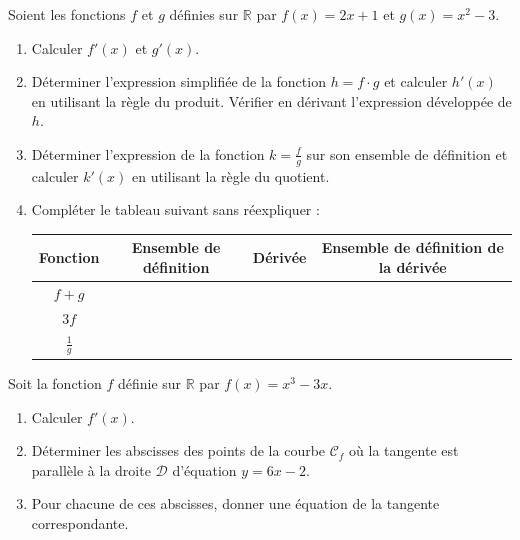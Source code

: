 \documentclass[11pt]{article}
\begin{document}
\begin{exercice}
Soient les fonctions $f$ et $g$ définies sur $\mathbb{R}$ par $f(x) = 2x + 1$ et $g(x) = x^2 - 3$.
\begin{enumerate}
    \item Calculer $f'(x)$ et $g'(x)$.
    \item Déterminer l'expression simplifiée de la fonction $h = f \cdot g$ et calculer $h'(x)$ en utilisant la règle du produit. Vérifier en dérivant l'expression développée de $h$.
    \item Déterminer l'expression de la fonction $k = \frac{f}{g}$ sur son ensemble de définition et calculer $k'(x)$ en utilisant la règle du quotient.
    \item Compléter le tableau suivant sans réexpliquer :
    \begin{center}
    \begin{tabular}{|c|c|c|c|}
    \hline
    Fonction & Ensemble de définition & Dérivée & Ensemble de définition de la dérivée \\
    \hline
    $f+g$ & & & \\
    \hline
    $3f$ & & & \\
    \hline
    $\frac{1}{g}$ & & & \\
    \hline
    \end{tabular}
    \end{center}
\end{enumerate}
\end{exercice}

\begin{exercice}
Soit la fonction $f$ définie sur $\mathbb{R}$ par $f(x) = x^3 - 3x$.
\begin{enumerate}
    \item Calculer $f'(x)$.
    \item Déterminer les abscisses des points de la courbe $\mathcal{C}_f$ où la tangente est parallèle à la droite $\mathcal{D}$ d'équation $y = 6x - 2$.
    \item Pour chacune de ces abscisses, donner une équation de la tangente correspondante.
\end{enumerate}
\end{exercice}
\end{document}
